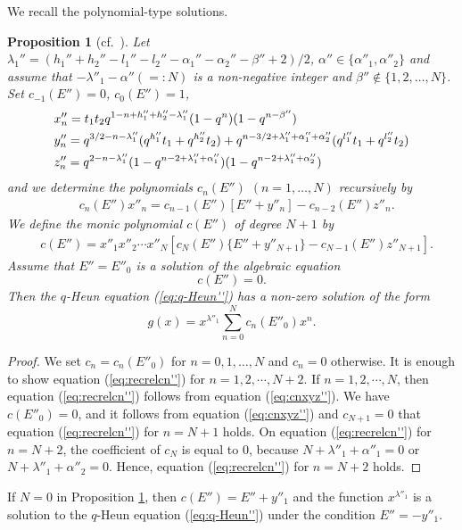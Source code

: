 \documentclass[12pt]{amsart}
\numberwithin{equation}{section}
\newtheorem{prop}[thm]{Proposition}
\theoremstyle{definition}
\theoremstyle{remark}
\begin{document}
We recall the polynomial-type solutions.
\begin{prop} [{cf.\ \cite[Proposition 2.2]{KST}}] \label{prop:polynom}
Let $\lambda_{1}'' = (h_{1}'' + h_{2}'' - l_{1}'' - l_{2}'' - \alpha_{1}'' - \alpha_{2}'' - \beta'' + 2)/2$, $\alpha '' \in \{  \alpha ''_1 , \alpha ''_2 \}$ and assume that $-\lambda ''_1 - \alpha '' (=: N)$ is a non-negative integer and $\beta '' \not \in \{ 1,2,\dots ,N\}$.
Set $c_{-1}(E'')=0 $,  $c_0(E'')=1 $,
\begin{align}
 & x''_n =  t_{1}t_{2}q^{  1- n + h''_{1} + h''_{2} - \lambda ''_{1}} (1 - q^{n})(1 - q^{n - \beta '' }) \label{eq:xyz''} \\
 & y''_n =  q^{3/2- n - \lambda ''_{1} } (q^{h''_{1}}t_{1} + q^{h''_{2}}t_{2} ) + q^{n - 3/2 + \lambda ''_{1} + \alpha ''_{1} + \alpha ''_{2} }( q^{l''_{1}}t_{1} + q^{l''_{2}}t_{2} )  \notag \\
 & z''_n = q^{ 2- n - \lambda ''_{1} } (1 - q^{n - 2 + \lambda ''_{1} + \alpha ''_{1} })(1 - q^{n - 2 + \lambda ''_{1} + \alpha ''_{2} }) \notag
\end{align}
and we determine the polynomials $c_n(E'')$ $(n=1,\dots ,N)$ recursively by
\begin{align}
 & c_{n} (E'') x''_n = c_{n - 1} (E'') [E'' + y''_n ] -c_{n-2} (E'') z''_n . \label{eq:cnxyz''}
\end{align}
We define the monic polynomial $c (E'')$ of degree $N+1$ by
\begin{align}
 & c (E'') = x''_1 x''_2 \cdots x''_{N} [ c_{N} (E'') \{ E'' + y''_{N+1} \} -c_{N-1} (E'') z''_{N+1} ] . \label{eq:cxyz''}
\end{align}
Assume that $E''=E''_0$ is a solution of the algebraic equation
\begin{equation}
c (E'')=0 .
\label{eq:cN+1}
\end{equation}
Then the $q$-Heun equation (\ref{eq:q-Heun''}) has a non-zero solution of the form
\begin{equation}
g(x)= x^{\lambda ''_1} \sum _{n=0}^{N } c_n (E''_0)  x^n .
\label{eq:gxxlapol}
\end{equation}
\end{prop}
\begin{proof}
We set $c_n = c_n (E''_0)$ for  $n=0,1,\dots ,N$ and $c_n =0$ otherwise.
It is enough to show equation (\ref{eq:recrelcn''}) for $n = 1 ,2, \cdots , N+2$.
If $n = 1 ,2, \cdots , N$, then equation (\ref{eq:recrelcn''}) follows from equation (\ref{eq:cnxyz''}).
We have $c (E'' _0)=0$, and it follows from equation (\ref{eq:cnxyz''}) and $c_{N+1} =0$ that equation (\ref{eq:recrelcn''}) for $n = N+1$ holds.
On equation (\ref{eq:recrelcn''}) for $n = N+2$, the coefficient of $c_N $ is equal to $0$, because $N+ \lambda ''_1 + \alpha '' _1= 0$ or $N+ \lambda ''_1 + \alpha '' _2= 0$.
Hence, equation (\ref{eq:recrelcn''}) for $n = N+2$ holds.
\end{proof}
If $N=0$ in Proposition \ref{prop:polynom}, then $c (E'') = E'' + y''_1$ and the function $x^{\lambda ''_1}$ is a solution to the $q$-Heun equation (\ref{eq:q-Heun''}) under the condition $E'' =- y''_1 $.
\end{document}
